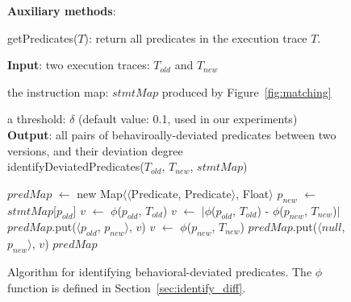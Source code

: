\begin{figure}[t]

\textbf{Auxiliary methods}: 

\quad getPredicates($\mathit{T}$): return all predicates in the execution trace $\mathit{T}$.

\textbf{Input}: two execution traces: $\mathit{T_{old}}$ and $T_{new}$

\quad the instruction map: $\mathit{stmtMap}$ produced by Figure~\ref{fig:matching}

\quad a threshold: $\delta$ (default value: 0.1, used in our experiments)\\
\textbf{Output}: all pairs of behaviroally-deviated predicates between two versions, and their deviation degree\\
\vspace{-4mm}%
identifyDeviatedPredicates($\mathit{T_{old}}$, $\mathit{T_{new}}$, $\mathit{stmtMap}$)\\
\begin{algorithmic}[1]
\STATE $\mathit{predMap}$ $\leftarrow$ new Map$\langle$$\langle$Predicate, Predicate$\rangle$, Float$\rangle$
\STATE $\mathit{p_{new}}$ $\leftarrow$ $\mathit{stmtMap}$[$\mathit{p_{old}}$]
\STATE $\mathit{v}$ $\leftarrow$ $\phi$($\mathit{p_{old}}$, $\mathit{T_{old}}$)
\STATE $\mathit{v}$ $\leftarrow$ $|\phi$($\mathit{p_{old}}$, $\mathit{T_{old}}$) - $\phi$($\mathit{p_{new}}$, $\mathit{T_{new}}$)$|$
\ENDIF
{}
\STATE $\mathit{predMap}$.put($\langle$$\mathit{p_{old}}$, $p_{new}$$\rangle$, $\mathit{v}$)
\ENDIF
\ENDFOR
{}
\STATE $\mathit{v}$ $\leftarrow$ $\phi$($\mathit{p_{new}}$, $\mathit{T_{new}}$)
\STATE $\mathit{predMap}$.put($\langle$$\mathit{null}$, $p_{new}$$\rangle$, $\mathit{v}$)
\ENDIF
\ENDIF
\ENDFOR
\RETURN $\mathit{predMap}$
\end{algorithmic}
\caption{Algorithm for identifying behavioral-deviated
predicates. The $\phi$ function is defined in Section~\ref{sec:identify_diff}.
\label{fig:identify}
}
\end{figure}
